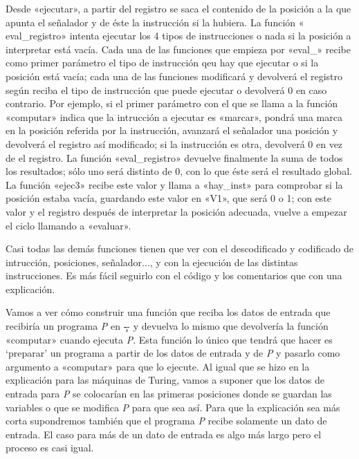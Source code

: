 Desde «{\fgabrielen ejecutar}», a partir del registro se saca el contenido de la posición a la que
apunta el señalador y de éste la instrucción si la hubiera. La función «{\fgabrielen
eval\_registro}» intenta ejecutar los 4 tipos de instrucciones o nada si la posición a interpretar
está vacía. Cada una de las funciones que empieza por «{\fgabrielen eval\_}» recibe como primer
parámetro el tipo de instrucción qeu hay que ejecutar o si la posición está vacía; cada una de las
funciones modificará y devolverá el registro según reciba el tipo de instrucción que puede ejecutar
o devolverá 0 en caso contrario. Por ejemplo, si el primer parámetro con el que se llama a la
función «{\fgabrielen computar}» indica que la intrucción a ejecutar es «marcar», pondrá una marca
en la posición referida por la instrucción, avanzará el señalador una posición y devolverá el
registro así modificado; si la instrucción es otra, devolverá 0 en vez de el registro. La función
«{\fgabrielen eval\_registro}» devuelve finalmente la suma de todos los resultados; sólo uno será
distinto de 0, con lo que éste será el resultado global. La función «{\fgabrielen ejec3}» recibe
este valor y llama a «{\fgabrielen hay\_inst}» para comprobar si la posición estaba vacía, guardando
este valor en «{\fgabrielen V1}», que será 0 o 1; con este valor y el registro después de
interpretar la posición adecuada, vuelve a empezar el ciclo llamando a «{\fgabrielen evaluar}».

Casi todas las demás funciones tienen que ver con el descodificado y codificado de intrucción,
posiciones, señalador..., y con la ejecución de las distintas instrucciones. Es más fácil seguirlo
con el código y los comentarios que con una explicación.

Vamos a ver cómo construir una función que reciba los datos de entrada que recibiría un programa
{\it P} en \c-- y devuelva lo mismo que devolvería la función «{\fgabrielen computar}» cuando
ejecuta {\it P}. Esta función lo único que tendrá que hacer es ‘preparar’ un programa a partir de
los datos de entrada y de {\it P} y pasarlo como argumento a «{\fgabrielen computar}» para que lo
ejecute. Al igual que se hizo en la explicación para las máquinas de Turing, vamos a suponer que los
datos de entrada para {\it P} se colocarían en las primeras posiciones donde se guardan las
variables o que se modifica {\it P} para que sea así. Para que la explicación sea más corta
supondremos también que el programa {\it P} recibe solamente un dato de entrada. El caso para más de
un dato de entrada es algo más largo pero el proceso es casi igual.

